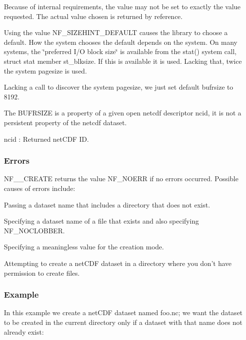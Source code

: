 Because of internal requirements, the value may not be set to exactly the value requested. The actual value chosen is returned by reference.

Using the value N\+F\+\_\+\+S\+I\+Z\+E\+H\+I\+N\+T\+\_\+\+D\+E\+F\+A\+U\+LT causes the library to choose a default. How the system chooses the default depends on the system. On many systems, the \char`\"{}preferred I/\+O block size\char`\"{} is available from the stat() system call, struct stat member st\+\_\+blksize. If this is available it is used. Lacking that, twice the system pagesize is used.

Lacking a call to discover the system pagesize, we just set default bufrsize to 8192.

The B\+U\+F\+R\+S\+I\+ZE is a property of a given open netcdf descriptor ncid, it is not a persistent property of the netcdf dataset.

{\ttfamily ncid} \+: Returned net\+C\+DF ID.

\subsubsection*{Errors}

N\+F\+\_\+\+\_\+\+C\+R\+E\+A\+TE returns the value N\+F\+\_\+\+N\+O\+E\+RR if no errors occurred. Possible causes of errors include\+:


\begin{DoxyItemize}
\item Passing a dataset name that includes a directory that does not exist.
\item Specifying a dataset name of a file that exists and also specifying N\+F\+\_\+\+N\+O\+C\+L\+O\+B\+B\+ER.
\item Specifying a meaningless value for the creation mode.
\item Attempting to create a net\+C\+DF dataset in a directory where you don’t have permission to create files.
\end{DoxyItemize}

\subsubsection*{Example}

In this example we create a net\+C\+DF dataset named foo.\+nc; we want the dataset to be created in the current directory only if a dataset with that name does not already exist\+:

 


